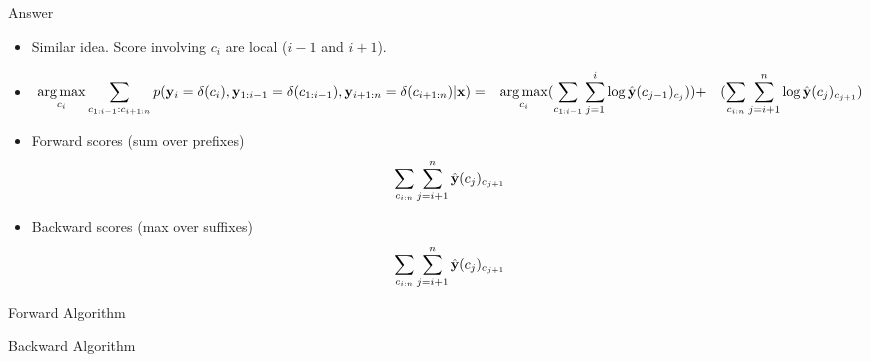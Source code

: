 \documentclass{beamer}
\begin{document}
\begin{frame}{Answer}
  \begin{itemize}
  \item Similar idea. Score involving $c_i$ are local ($i-1$ and $i+1$).
    \air 

  \item   
    \begin{eqnarray*}
      \argmax_{c_i} \sum_{c_{1:i-1}:c_{i+1:n}} p(\bold{y}_i = \delta(c_i),  \boldy_{1:i-1} = \delta(c_{1:i-1}), \boldy_{i+1:n} = \delta(c_{i+1:n})| \boldx ) & = &  \argmax_{c_i} (\sum_{c_{1:i-1}} \sum_{j=1}^i \log \hat{\boldy}(c_{j-1})_{c_{j}} ))  
      &+& (\sum_{c_{i:n}} \sum_{j=i+1}^n \log \hat{\boldy}(c_{j})_{c_{j+1}} ) \\      
    \end{eqnarray*}
    \air 

  \item  Forward scores (sum over prefixes)
    \[ \sum_{c_{i:n}} \sum_{j=i+1}^n \hat{\mathbf{y}}(c_{j})_{c_{j+1}} \]

    \air
  \item  Backward scores (max over suffixes)
   \[ \sum_{c_{i:n}} \sum_{j=i+1}^n \hat{\mathbf{y}}(c_{j})_{c_{j+1}} \]
  \end{itemize}
\end{frame}

\begin{frame}{Forward Algorithm}
  \begin{algorithmic}
    \EndFor{}
    \EndFor{}
    \EndProcedure{}
  \end{algorithmic}
\end{frame}


\begin{frame}{Backward Algorithm}
  \begin{algorithmic}
    \EndFor{}
    \EndFor{}
    \EndProcedure{}
  \end{algorithmic}
\end{frame}
\end{document}
